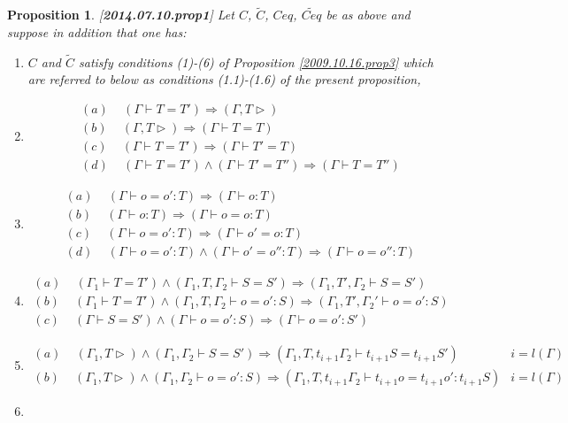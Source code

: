 \documentclass[11pt]{article}
\newtheorem{proposition}{Proposition}[subsection]
\newcommand{\llabel}[1]{\label{#1}[{\bf #1}]}
\newcommand{\wt}{\widetilde}
\newcommand{\spc}{{\,\,\,\,\,\,\,}}
\newcommand{\impl}{{\Rightarrow}}
\begin{document}
\begin{proposition}
\llabel{2014.07.10.prop1}
%
Let $C$, $\wt{C}$, $Ceq$, $\wt{Ceq}$ be as above and suppose in addition that one has:
%
\begin{enumerate}
\item $C$ and $\wt{C}$ satisfy conditions (1)-(6) of Proposition \ref{2009.10.16.prop3} which are referred to below as conditions (1.1)-(1.6) of the present proposition,
%
\item 
%
$$
\begin{array}{l}
(a)\spc(\Gamma\vdash T=T')\impl (\Gamma,T\rhd)\\
(b)\spc(\Gamma,T\rhd)\impl (\Gamma\vdash T=T)\\
(c )\spc(\Gamma\vdash T=T')\impl(\Gamma\vdash T'=T)\\
(d)\spc(\Gamma\vdash T=T')\wedge(\Gamma\vdash T'=T'')\impl(\Gamma\vdash T=T'')
\end{array}
$$
%
\item 
%
$$
\begin{array}{l}
(a)\spc(\Gamma\vdash o=o':T)\impl (\Gamma\vdash o:T)\\
(b)\spc(\Gamma\vdash o:T)\impl (\Gamma\vdash o=o:T)\\
(c )\spc(\Gamma\vdash o=o':T)\impl(\Gamma\vdash o'=o:T)\\
(d)\spc (\Gamma\vdash o=o':T)\wedge(\Gamma\vdash o'=o'':T)\impl(\Gamma\vdash o=o'':T)
\end{array}
$$
%
\item 
%
$$
\begin{array}{l}
(a)\spc (\Gamma_1\vdash T=T')\wedge(\Gamma_1,T,\Gamma_2\vdash S=S')\impl(\Gamma_1,T',\Gamma_2\vdash S=S')\\
(b)\spc (\Gamma_1\vdash T=T')\wedge(\Gamma_1,T,\Gamma_2\vdash o=o':S)\impl(\Gamma_1,T',\Gamma_2'\vdash o=o':S)\\
(c )\spc (\Gamma\vdash S=S')\wedge(\Gamma\vdash o=o':S)\impl(\Gamma\vdash o=o':S')
\end{array}
$$
%
\item 
%
$$
\begin{array}{ll}
(a)\spc (\Gamma_1,T\rhd)\wedge(\Gamma_1,\Gamma_2\vdash S=S')\impl(\Gamma_1,T,t_{i+1}\Gamma_2\vdash t_{i+1}S=t_{i+1}S')& i=l(\Gamma)\\
(b)\spc (\Gamma_1,T\rhd)\wedge(\Gamma_1,\Gamma_2\vdash o=o':S)\impl(\Gamma_1,T,t_{i+1}\Gamma_2\vdash t_{i+1}o=t_{i+1}o':t_{i+1}S)& i=l(\Gamma)
\end{array}
$$
%
\item
%
$$
\begin{array}{ll}

\end{array}$$
\end{enumerate}
\end{proposition}
\end{document}
